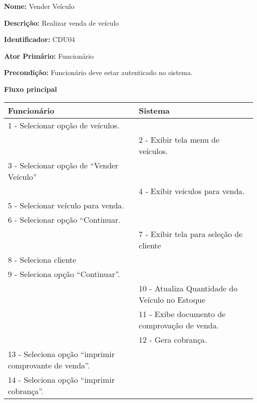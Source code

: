 \par
\textbf{Nome:} Vender Veículo 
\par
\textbf{Descrição:} Realizar venda de veículo 
\par 
\textbf{Identificador:} CDU04
\par
\textbf{Ator Primário:} Funcionário	
\par
\textbf{Precondição:} Funcionário deve estar autenticado no sistema.
\par	
\par
\textbf{Fluxo principal}\par
\begin{tabular}{|p{7cm}|p{7cm}|}
	\hline 
	
	
	Funcionário
	& 
	
	Sistema
	\\ 
	\hline 
	
	
	1 - Selecionar opção de veículos.
	&  \\ 
	\hline 
	& 
	
	2 - Exibir tela menu de veículos.
	\\ 
	\hline 
	
	
	3 - Selecionar opção de “Vender Veículo”
	&  \\ 
	\hline 
	& 
	
	4 - Exibir veículos para venda.
	\\ 
	\hline 
	
	
	5 - Selecionar veículo para venda.
	&  \\ 
	\hline 
	
	
	6 - Selecionar opção “Continuar.
	&  \\ 
	\hline 
	& 
	
	7 - Exibir tela para seleção de cliente
	\\ 
	\hline 
	
	
	8 - Seleciona cliente
	&  \\ 
	\hline 
	
	
	9 - Seleciona opção “Continuar”. 
	&  \\ 
	\hline 
	& 
	
	10 - Atualiza Quantidade do Veículo no Estoque
	\\ 
	\hline 
	& 
	
	11 - Exibe documento de comprovação de venda. 
	\\ 
	\hline 
	& 
	
	12 - Gera cobrança.
	\\ 
	\hline 
	
	
	13 - Seleciona opção “imprimir comprovante de venda”.
	&  \\ 
	\hline 
	
	
	14 - Seleciona opção “imprimir cobrança”.
	&  \\ 
	\hline 
\end{tabular}  
\vspace{12px}


